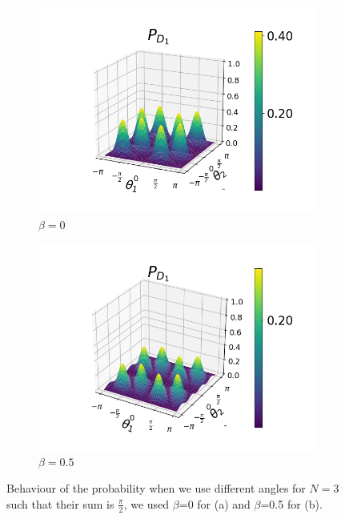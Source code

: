 \documentclass[12pt]{book}
\begin{document}
\begin{figure}[!t]
\begin{subfigure}[b]{0.4\linewidth}
\includegraphics[width=\linewidth]{images/beta_theta2.png}
\caption{$\beta=0$}
\label{fig:BS1}
\end{subfigure}
\begin{subfigure}[b]{0.4\linewidth}
\includegraphics[width=\linewidth]{images/beta_theta.png}
\caption{$\beta=0.5$}
\label{fig:westminster_aerea}
\end{subfigure}

\caption{Behaviour of the probability when we use different angles for $N=3$ such that their sum is $\frac{\pi}{2}$, we used $\beta$=0 for (a) and $\beta$=0.5 for (b).}
\end{figure}
\end{document}
